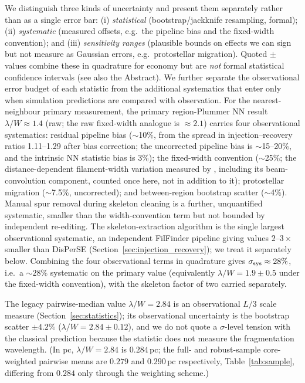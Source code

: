 \documentclass[usenatbib,twoside,twocolumn]{mnras}
\begin{document}
We distinguish three kinds of uncertainty and present them separately rather than as a single error bar: (i) \emph{statistical} (bootstrap/jackknife resampling, formal); (ii) \emph{systematic} (measured offsets, e.g.\ the pipeline bias and the fixed-width convention); and (iii) \emph{sensitivity ranges} (plausible bounds on effects we can sign but not measure as Gaussian errors, e.g.\ protostellar migration). Quoted $\pm$ values combine these in quadrature for economy but are \emph{not} formal statistical confidence intervals (see also the Abstract). We further separate the observational error budget of each statistic from the additional systematics that enter only when simulation predictions are compared with observation. For the nearest-neighbour primary measurement, the primary region-Plummer NN result $\lambda/W\approx1.4$ (raw; the raw fixed-width analogue is $\approx2.1$) carries four observational systematics: residual pipeline bias ($\sim$10\%, from the spread in injection--recovery ratios 1.11--1.29 after bias correction; the uncorrected pipeline bias is $\sim$15--20\%, and the intrinsic NN statistic bias is 3\%); the fixed-width convention ($\sim$25\%; the distance-dependent filament-width variation measured by \citealt{Panopoulou2022}, including its beam-convolution component, counted once here, not in addition to it); protostellar migration ($\sim$7.5\%, uncorrected); and between-region bootstrap scatter ($\sim$4\%). Manual spur removal during skeleton cleaning is a further, unquantified systematic, smaller than the width-convention term but not bounded by independent re-editing. The skeleton-extraction algorithm is the single largest observational systematic, an independent FilFinder pipeline giving values $2$--$3\times$ smaller than DisPerSE (Section~\ref{sec:injection_recovery}); we treat it separately below. Combining the four observational terms in quadrature gives $\sigma_{\rm sys}\approx28\%$, i.e.\ a $\sim28\%$ systematic on the primary value (equivalently $\lambda/W=1.9\pm0.5$ under the fixed-width convention), with the skeleton factor of two carried separately.

The legacy pairwise-median value $\lambda/W=2.84$ is an observational $L/3$ scale measure (Section~\ref{sec:statistics}); its observational uncertainty is the bootstrap scatter $\pm4.2\%$ ($\lambda/W=2.84\pm0.12$), and we do not quote a $\sigma$-level tension with the classical prediction because the statistic does not measure the fragmentation wavelength. (In pc, $\lambda/W=2.84$ is $0.284$\,pc; the full- and robust-sample core-weighted pairwise means are $0.279$ and $0.290$\,pc respectively, Table~\ref{tab:sample}, differing from $0.284$ only through the weighting scheme.)
\end{document}
